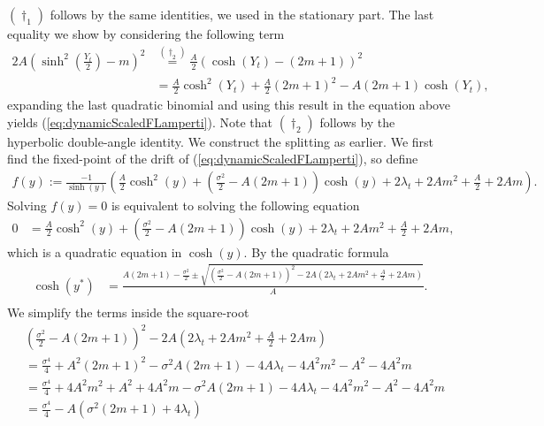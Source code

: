 $(\dagger_1)$ follows by the same identities, we used in the stationary part. The last equality we show by considering the following term
\begin{align*}
    2A\left(\sinh^2\left(\frac{Y_t}{2}\right) - m\right)^2 &\overset{(\dagger_2)}{=} \frac{A}{2}\left(\cosh(Y_t) - \left(2m + 1\right)\right)^2 \\
    &= \frac{A}{2}\cosh^2(Y_t) + \frac{A}{2}\left(2m +1\right)^2 - A\left(2m + 1\right)\cosh(Y_t),
\end{align*}
expanding the last quadratic binomial and using this result in the equation above yields (\ref{eq:dynamicScaledFLamperti}). Note that $(\dagger_2)$ follows by the hyperbolic double-angle identity.
We construct the splitting as earlier. We first find the fixed-point of the drift of (\ref{eq:dynamicScaledFLamperti}), so define
\begin{align}
    f(y) := \frac{-1}{\sinh\left(y\right)}\left(\frac{A}{2}\cosh^2\left(y\right) + \left(\frac{\sigma^2}{2} - A \left(2m + 1\right)\right)\cosh\left(y\right) + 2\lambda_t + 2Am^2 + \frac{A}{2} + 2Am\right). \nonumber
\end{align}
Solving $f(y) = 0$ is equivalent to solving the following equation
\begin{align}
    0 &= \frac{A}{2}\cosh^2\left(y\right) + \left(\frac{\sigma^2}{2} - A \left(2m + 1\right)\right)\cosh\left(y\right) + 2\lambda_t + 2Am^2 + \frac{A}{2} + 2Am,
\end{align}
which is a quadratic equation in $\cosh(y)$. By the quadratic formula
\begin{align}
    \cosh(y^*) &= \frac{A\left(2m + 1\right) - \frac{\sigma^2}{2} \pm \sqrt{\left(\frac{\sigma^2}{2} - A \left(2m + 1\right)\right)^2 - 2A\left(2\lambda_t + 2Am^2 + \frac{A}{2} + 2Am\right)}}{A}.\nonumber\\
\end{align}
We simplify the terms inside the square-root
\begin{align*}
    &\left(\frac{\sigma^2}{2} - A \left(2m + 1\right)\right)^2 - 2A\left(2\lambda_t + 2Am^2 + \frac{A}{2} + 2Am\right)\\
    &=\frac{\sigma^4}{4} + A^2\left(2m + 1\right)^2 -\sigma^2A\left(2m+1\right) - 4A\lambda_t - 4A^2m^2 - A^2 - 4A^2m\\
    &= \frac{\sigma^4}{4} + 4A^2m^2 + A^2 +4A^2m - \sigma^2A\left(2m + 1\right) - 4A\lambda_t - 4A^2m^2 - A^2 - 4A^2m \\
    &=\frac{\sigma^4}{4} - A\left(\sigma^2\left(2m + 1\right) + 4\lambda_t\right)
\end{align*}
